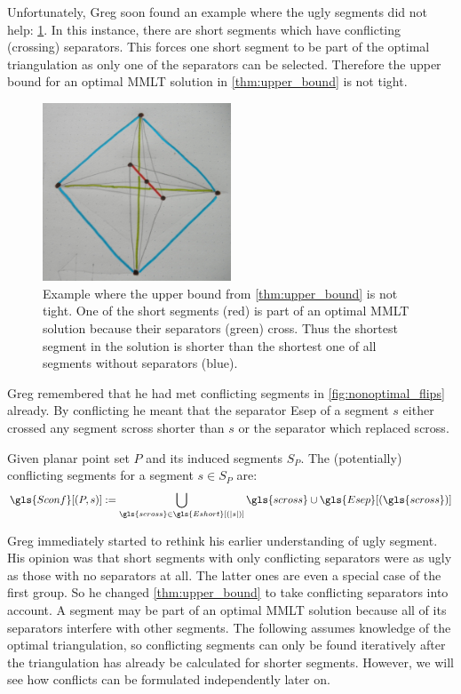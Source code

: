 Unfortunately, Greg soon found an example where the ugly segments did
not help: \cref{fig:upper_bound_tightness}. In this instance, there
are short segments which have conflicting (crossing) separators. This
forces one short segment to be part of the optimal triangulation as
only one of the separators can be selected. Therefore the upper bound
for an optimal \gls{MMLT} solution in \cref{thm:upper_bound} is not
tight.

\begin{figure}[ht]
  \centering
  \includegraphics[width=0.5\textwidth]{img/upper_bound_tightness.jpg}
  \caption{
    \label{fig:upper_bound_tightness}
    Example where the upper bound from \cref{thm:upper_bound} is not 
    tight. One of the short segments (red) is part of an optimal 
    \gls{MMLT} solution because their separators (green) cross. Thus
    the shortest segment in the solution is shorter than the shortest
    one of all segments without separators (blue).
  }
\end{figure}  

Greg remembered that he had met conflicting segments in 
\cref{fig:nonoptimal_flips} already. By conflicting he meant that the
separator \gls{Esep} of a segment \(s\) either crossed any segment
\gls{scross} shorter than \(s\) or the separator which replaced
\gls{scross}. 

\begin{definition}\label{def:conflicting_segments}
  Given planar point set \(P\) and its induced segments \(S_P\). The
  (potentially) conflicting segments for a segment \(s \in S_P\) are:
  \[
    \gls{Sconf}[(P,s)] :=
      \bigcup_{\gls{scross} \in \gls{Eshort}[(|s|)]}
      \gls{scross} \cup \gls{Esep}[(\gls{scross})]
  \]
\end{definition}

Greg immediately started to rethink his earlier understanding of ugly
segment. His opinion was that short segments with only conflicting
separators were as ugly as those with no separators at all. The latter
ones are even a special case of the first group. So he changed
\cref{thm:upper_bound} to take conflicting separators into account. A 
segment may be part of an optimal \gls{MMLT} solution because all of
its separators interfere with other segments. The following
assumes knowledge of the optimal triangulation, so conflicting segments 
can only be found iteratively after the triangulation has already be 
calculated for shorter segments. However, we will see how conflicts can 
be formulated independently later on.

